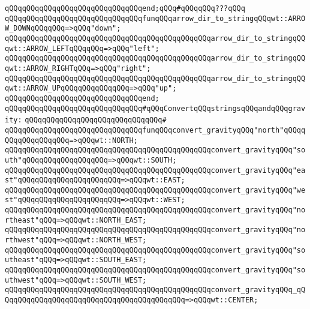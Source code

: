 \verb|qQQqqQQqqQQqqQQqqQQqqQQqqQQqqQQqend;qQQq#qQQqqQQq???qQQq|\newline
\newline
\verb|qQQqqQQqqQQqqQQqqQQqqQQqqQQqqQQqfunqQQqarrow_dir_to_stringqQQqwt::ARROW_DOWNqQQqqQQq=>qQQq"down";|\newline
\verb|qQQqqQQqqQQqqQQqqQQqqQQqqQQqqQQqqQQqqQQqqQQqqQQqarrow_dir_to_stringqQQqwt::ARROW_LEFTqQQqqQQq=>qQQq"left";|\newline
\verb|qQQqqQQqqQQqqQQqqQQqqQQqqQQqqQQqqQQqqQQqqQQqqQQqarrow_dir_to_stringqQQqwt::ARROW_RIGHTqQQq=>qQQq"right";|\newline
\verb|qQQqqQQqqQQqqQQqqQQqqQQqqQQqqQQqqQQqqQQqqQQqqQQqarrow_dir_to_stringqQQqwt::ARROW_UPqQQqqQQqqQQqqQQq=>qQQq"up";|\newline
\verb|qQQqqQQqqQQqqQQqqQQqqQQqqQQqqQQqend;|\newline
\newline
\verb|qQQqqQQqqQQqqQQqqQQqqQQqqQQqqQQq#qQQqConvertqQQqstringsqQQqandqQQqgravity:|\newline
\verb|qQQqqQQqqQQqqQQqqQQqqQQqqQQqqQQq#|\newline
\verb|qQQqqQQqqQQqqQQqqQQqqQQqqQQqqQQqfunqQQqconvert_gravityqQQq"north"qQQqqQQqqQQqqQQqqQQq=>qQQqwt::NORTH;|\newline
\verb|qQQqqQQqqQQqqQQqqQQqqQQqqQQqqQQqqQQqqQQqqQQqqQQqconvert_gravityqQQq"south"qQQqqQQqqQQqqQQqqQQq=>qQQqwt::SOUTH;|\newline
\verb|qQQqqQQqqQQqqQQqqQQqqQQqqQQqqQQqqQQqqQQqqQQqqQQqconvert_gravityqQQq"east"qQQqqQQqqQQqqQQqqQQqqQQq=>qQQqwt::EAST;|\newline
\verb|qQQqqQQqqQQqqQQqqQQqqQQqqQQqqQQqqQQqqQQqqQQqqQQqconvert_gravityqQQq"west"qQQqqQQqqQQqqQQqqQQqqQQq=>qQQqwt::WEST;|\newline
\verb|qQQqqQQqqQQqqQQqqQQqqQQqqQQqqQQqqQQqqQQqqQQqqQQqconvert_gravityqQQq"northeast"qQQq=>qQQqwt::NORTH_EAST;|\newline
\verb|qQQqqQQqqQQqqQQqqQQqqQQqqQQqqQQqqQQqqQQqqQQqqQQqconvert_gravityqQQq"northwest"qQQq=>qQQqwt::NORTH_WEST;|\newline
\verb|qQQqqQQqqQQqqQQqqQQqqQQqqQQqqQQqqQQqqQQqqQQqqQQqconvert_gravityqQQq"southeast"qQQq=>qQQqwt::SOUTH_EAST;|\newline
\verb|qQQqqQQqqQQqqQQqqQQqqQQqqQQqqQQqqQQqqQQqqQQqqQQqconvert_gravityqQQq"southwest"qQQq=>qQQqwt::SOUTH_WEST;|\newline
\verb|qQQqqQQqqQQqqQQqqQQqqQQqqQQqqQQqqQQqqQQqqQQqqQQqconvert_gravityqQQq_qQQqqQQqqQQqqQQqqQQqqQQqqQQqqQQqqQQqqQQqqQQq=>qQQqwt::CENTER;|\newline

